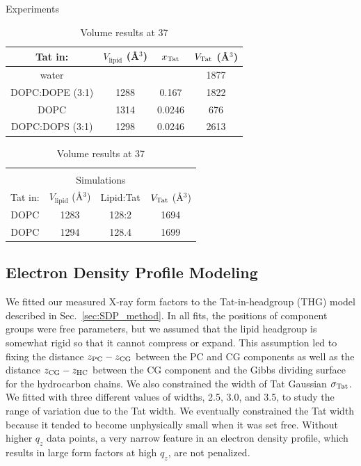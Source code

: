 \begin{table}[htbp]
  \centering
  Experiments\\
  \begin{tabular}{cccc}
    \hline
    Tat in: & $V_\textrm{lipid}$ (\AA$^3$) & $x_\textrm{Tat}$ & $V_\textrm{Tat}$ (\AA$^3$) \\
    \hline
    water & & & 1877 \\
    DOPC:DOPE (3:1) & 1288 & 0.167 & 1822 \\
    DOPC & 1314 & 0.0246 & 676 \\
    DOPC:DOPS (3:1) & 1298 & 0.0246 & 2613 \\
    \hline 
  \end{tabular}
  \quad
  \begin{tabular}{cccc}
    & & & \\
    \multicolumn{4}{c}{Simulations} \\ 
    \hline
    Tat in: & $V_\textrm{lipid}$ (\AA$^3$) & Lipid:Tat & $V_\textrm{Tat}$ (\AA$^3$) \\
    \hline
    DOPC & 1283 & 128:2 & 1694 \\
    DOPC & 1294 & 128.4 & 1699 \\
    \hline
  \end{tabular}
  \caption{Volume results at 37 \textcelsius}
  \label{tab:volumes}
\end{table}

\subsection{Electron Density Profile Modeling}\label{sec:SDP_results}
We fitted our measured X-ray form factors to the Tat-in-headgroup (THG) model described in 
Sec.~\ref{sec:SDP_method}. In all fits,
the positions of component groups were free parameters, but we 
assumed that the lipid headgroup is somewhat rigid so that it cannot compress
or expand. This assumption led to fixing the distance
$z_\textrm{PC}-z_\textrm{CG}$ between the PC and CG components as well
as the distance $z_\textrm{CG}-z_\textrm{HC}$ between the CG component and the Gibbs dividing
surface for the hydrocarbon chains. 
We also constrained the width of Tat 
Gaussian $\sigma_\textrm{Tat}$. We fitted with three different values of widths,
2.5, 3.0, and 3.5, to study the range of variation due to the Tat width. 
We eventually constrained the Tat width 
because it tended to become unphysically small
when it was set free. Without higher $q_z$ data points, a very narrow feature
in an electron density profile, which results in large form factors at high $q_z$,
are not penalized.  

